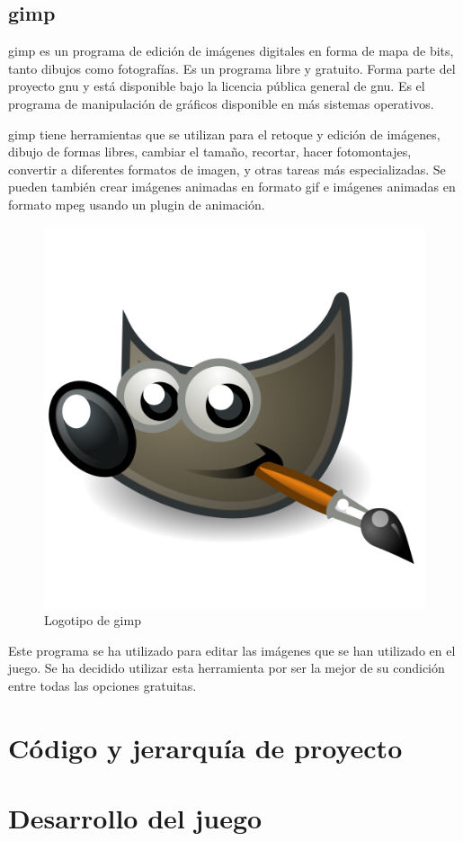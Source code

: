 	\subsection{\acrshort{gimp}}

		\acrfull{gimp} es un programa de edición de imágenes digitales en forma de mapa de bits, tanto dibujos como fotografías. Es un programa libre y gratuito. Forma parte del proyecto \acrshort{gnu} y está disponible bajo la licencia pública general de \acrshort{gnu}. Es el programa de manipulación de gráficos disponible en más sistemas operativos.

		\acrshort{gimp} tiene herramientas que se utilizan para el retoque y edición de imágenes, dibujo de formas libres, cambiar el tamaño, recortar, hacer fotomontajes, convertir a diferentes formatos de imagen, y otras tareas más especializadas. Se pueden también crear imágenes animadas en formato \acrshort{gif} e imágenes animadas en formato \acrshort{mpeg} usando un plugin de animación.

		\begin{figure}[!htp]
			 \centering
			 \includegraphics[scale=.15]{fig/gimp}
			 \caption{Logotipo de \acrshort{gimp}}
			 \label{fig:gimp}
		\end{figure}

		\FloatBarrier

		Este programa se ha utilizado para editar las imágenes que se han utilizado en el juego. Se ha decidido utilizar esta herramienta por ser la mejor de su condición entre todas las opciones gratuitas.

\section{Código y jerarquía de proyecto}

\section{Desarrollo del juego}